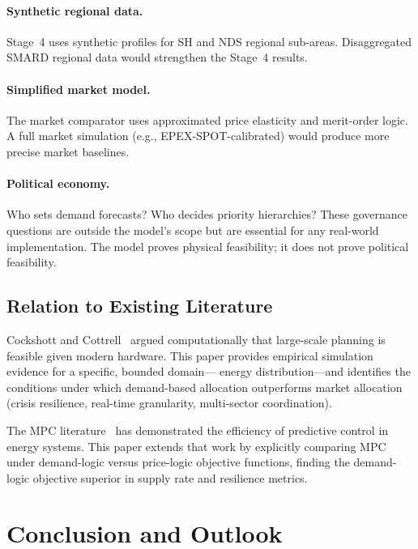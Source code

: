\documentclass[12pt]{article}
\begin{document}
{{\paragraph{Synthetic regional data.}
Stage~4 uses synthetic profiles for SH and NDS regional sub-areas.
Disaggregated SMARD regional data would strengthen the Stage~4 results.

\paragraph{Simplified market model.}
The market comparator uses approximated price elasticity and merit-order logic.
A full market simulation (e.g., EPEX-SPOT-calibrated) would produce more precise
market baselines.

\paragraph{Political economy.}
Who sets demand forecasts? Who decides priority hierarchies?
These governance questions are outside the model's scope but are essential for any
real-world implementation.
The model proves physical feasibility; it does not prove political feasibility.

\subsection{Relation to Existing Literature}

Cockshott and Cottrell~\citep{cockshott1993socialism} argued computationally that
large-scale planning is feasible given modern hardware.
This paper provides empirical simulation evidence for a specific, bounded domain---
energy distribution---and identifies the conditions under which demand-based
allocation outperforms market allocation (crisis resilience, real-time granularity,
multi-sector coordination).

The MPC literature~\citep{halvgaard2012mpc, parisio2014mpc} has demonstrated the
efficiency of predictive control in energy systems.
This paper extends that work by explicitly comparing MPC under demand-logic versus
price-logic objective functions, finding the demand-logic objective superior in supply
rate and resilience metrics.

\section{Conclusion and Outlook}

}}
\end{document}
